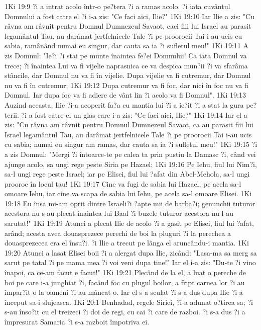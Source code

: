 1Ki 19:9  ?i a intrat acolo într-o pe?tera ?i a ramas acolo. ?i iata cuvântul Domnului a fost catre el ?i i-a zis: "Ce faci aici, Ilie?"
1Ki 19:10  Iar Ilie a zis: "Cu râvna am râvnit pentru Domnul Dumnezeul Savaot, caci fiii lui Israel au parasit legamântul Tau, au darâmat jertfelnicele Tale ?i pe proorocii Tai i-au ucis cu sabia, ramânând numai eu singur, dar cauta sa ia ?i sufletul meu!"
1Ki 19:11  A zis Domnul: "Ie?i ?i stai pe munte înaintea fe?ei Domnului! Ca iata Domnul va trece; ?i înaintea Lui va fi vijelie naprasnica ce va despica mun?ii ?i va sfarâma stâncile, dar Domnul nu va fi în vijelie. Dupa vijelie va fi cutremur, dar Domnul nu va fi în cutremur;
1Ki 19:12  Dupa cutremur va fi foc, dar nici în foc nu va fi Domnul. Iar dupa foc va fi adiere de vânt lin ?i acolo va fi Domnul".
1Ki 19:13  Auzind aceasta, Ilie ?i-a acoperit fa?a cu mantia lui ?i a ie?it ?i a stat la gura pe?terii. ?i a fost catre el un glas care i-a zis: "Ce faci aici, Ilie?"
1Ki 19:14  Iar el a zis: "Cu râvna am râvnit pentru Domnul Dumnezeul Savaot, ca au parasit fiii lui Israel legamântul Tau, au darâmat jertfelnicele Tale ?i pe proorocii Tai i-au ucis cu sabia; numai eu singur am ramas, dar cauta sa ia ?i sufletul meu!"
1Ki 19:15  ?i a zis Domnul: "Mergi ?i întoarce-te pe calea ta prin pustiu la Damasc ?i, când vei ajunge acolo, sa ungi rege peste Siria pe Hazael;
1Ki 19:16  Pe Iehu, fiul lui Nim?i, sa-l ungi rege peste Israel; iar pe Elisei, fiul lui ?afat din Abel-Mehola, sa-l ungi prooroc în locul tau!
1Ki 19:17  Cine va fugi de sabia lui Hazael, pe acela sa-l omoare Iehu, iar cine va scapa de sabia lui Iehu, pe acela sa-l omoare Elisei.
1Ki 19:18  Eu însa mi-am oprit dintre Israeli?i ?apte mii de barba?i; genunchii tuturor acestora nu s-au plecat înaintea lui Baal ?i buzele tuturor acestora nu l-au sarutat!"
1Ki 19:19  Atunci a plecat Ilie de acolo ?i a gasit pe Elisei, fiul lui ?afat, arând; acesta avea douasprezece perechi de boi la pluguri ?i la perechea a douasprezecea era el însu?i. ?i Ilie a trecut pe lânga el aruncându-i mantia.
1Ki 19:20  Atunci a lasat Elisei boii ?i a alergat dupa Ilie, zicând: "Lasa-ma sa merg sa sarut pe tatal ?i pe mama mea ?i voi veni dupa tine!" Iar el i-a zis: "Du-te ?i vino înapoi, ca ce-am facut e facut!"
1Ki 19:21  Plecând de la el, a luat o pereche de boi pe care i-a junghiat ?i, facând foc cu plugul boilor, a fript carnea lor ?i au împar?it-o la oameni ?i au mâncat-o. Iar el s-a sculat ?i s-a dus dupa Ilie ?i a început sa-i slujeasca.
1Ki 20:1  Benhadad, regele Siriei, ?i-a adunat o?tirea sa; ?i s-au înso?it cu el treizeci ?i doi de regi, cu cai ?i care de razboi. ?i s-a dus ?i a împresurat Samaria ?i s-a razboit împotriva ei.
